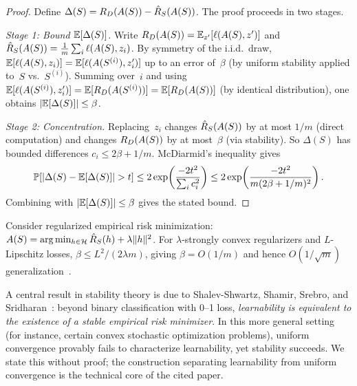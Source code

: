 \begin{proof}
Define $\Delta(S) = R_D(A(S)) - \hat{R}_S(A(S))$.  The proof
proceeds in two stages.

\emph{Stage 1: Bound $\mathbb{E}[\Delta(S)]$.}
Write $R_D(A(S)) = \mathbb{E}_{z'}[\ell(A(S), z')]$ and
$\hat{R}_S(A(S)) = \frac{1}{m}\sum_i \ell(A(S), z_i)$.  By symmetry of
the i.i.d.\ draw,
$\mathbb{E}[\ell(A(S), z_i)] = \mathbb{E}[\ell(A(S^{(i)}), z_i')]$
up to an error of~$\beta$ (by uniform stability applied to~$S$
vs.~$S^{(i)}$).  Summing over~$i$ and using
$\mathbb{E}[\ell(A(S^{(i)}), z_i')] = \mathbb{E}[R_D(A(S^{(i)}))] =
\mathbb{E}[R_D(A(S))]$ (by identical distribution), one obtains
$|\mathbb{E}[\Delta(S)]| \leq \beta$.

\emph{Stage 2: Concentration.}
Replacing~$z_i$ changes $\hat{R}_S(A(S))$ by at most $1/m$ (direct
computation) and changes $R_D(A(S))$ by at most~$\beta$ (via
stability).  So $\Delta(S)$ has bounded differences
$c_i \leq 2\beta + 1/m$.  McDiarmid's inequality gives
\[
  \mathbb{P}[|\Delta(S) - \mathbb{E}[\Delta(S)]| > t]
  \leq 2\exp\!\left(\frac{-2t^2}{\sum_i c_i^2}\right)
  \leq 2\exp\!\left(\frac{-2t^2}{m(2\beta+1/m)^2}\right).
\]
Combining with $|\mathbb{E}[\Delta(S)]| \leq \beta$ gives the stated bound.
\end{proof}

\begin{example}
\label{ex:regularized-erm-stable}
Consider regularized empirical risk minimization:
$A(S) = \arg\min_{h \in \mathcal{H}} \hat{R}_S(h) +
\lambda \|h\|^2$.  For $\lambda$-strongly convex regularizers and
$L$-Lipschitz losses, $\beta \leq L^2/(2\lambda m)$, giving
$\beta = O(1/m)$ and hence $O(1/\sqrt{m})$
generalization~\cite{BousquetElisseeff2002}.
\end{example}

\begin{remark}
\label{rmk:stability-beyond}
A central result in stability theory is due to Shalev-Shwartz, Shamir,
Srebro, and Sridharan~\cite{ShalevShwartzShamir2010}: beyond binary
classification with 0--1 loss, \emph{learnability is equivalent to the
existence of a stable empirical risk minimizer}.  In this more general
setting (for instance, certain convex stochastic optimization
problems), uniform convergence provably fails to characterize learnability,
yet stability succeeds.  We state this without proof; the construction
separating learnability from uniform convergence is the technical core of
the cited paper.
\end{remark}


